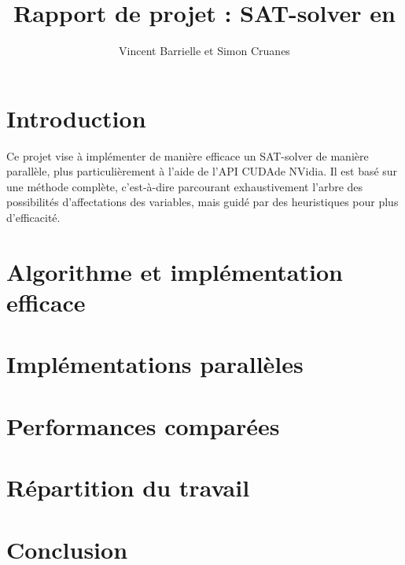 \documentclass{article}
\author{Vincent Barrielle et Simon Cruanes}
\title{Rapport de projet : \textsc{SAT}-solver en \cuda}
\newcommand{\cuda}{\textsc{CUDA}}
\begin{document}
\maketitle
\tableofcontents%
\newpage

\section{Introduction}
Ce projet vise à implémenter de manière efficace un \textsc{SAT}-solver de manière parallèle, plus particulièrement à l'aide de l'\textsc{API} \cuda de NVidia. Il est basé sur une méthode complète, c'est-à-dire parcourant exhaustivement l'arbre des possibilités d'affectations des variables, mais guidé par des heuristiques pour plus d'efficacité.

\section{Algorithme et implémentation efficace}



\section{Implémentations parallèles}


\section{Performances comparées}



\section{Répartition du travail}


\section{Conclusion}
\end{document}
